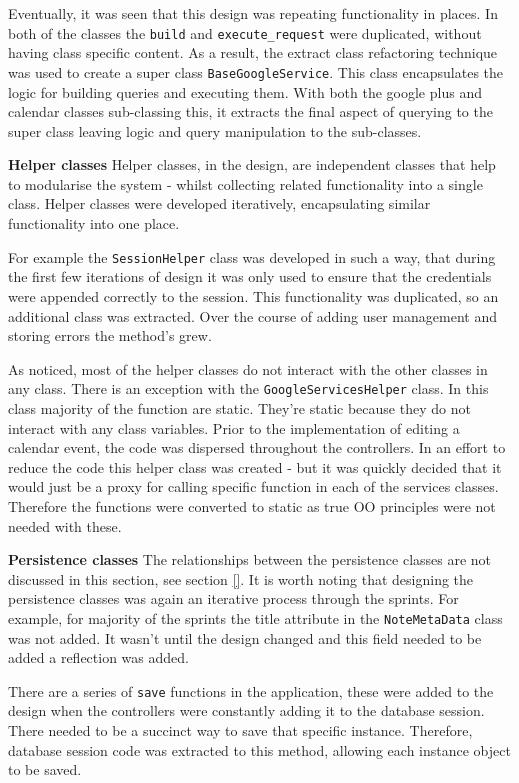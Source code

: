 Eventually, it was seen that this design was repeating functionality in places. In both of the classes the \texttt{build} and \texttt{execute\_request} were duplicated, without having class specific content. As a result, the extract class refactoring technique was used to create a super class \texttt{BaseGoogleService}. This class encapsulates the logic for building queries and executing them. With both the google plus and calendar classes sub-classing this, it extracts the final aspect of querying to the super class leaving logic and query manipulation to the sub-classes.

\textbf{Helper classes}
Helper classes, in the design, are independent classes that help to modularise the system - whilst collecting related functionality into a single class. Helper classes were developed iteratively, encapsulating similar functionality into one place.

For example the \texttt{SessionHelper} class was developed in such a way, that during the first few iterations of design it was only used to ensure that the credentials were appended correctly to the session. This functionality was duplicated, so an additional class was extracted. Over the course of adding user management and storing errors the method's grew.

As noticed, most of the helper classes do not interact with the other classes in any class. There is an exception with the \texttt{GoogleServicesHelper} class. In this class majority of the function are static.  They're static because they do not interact with any class variables. Prior to the implementation of editing a calendar event, the code was dispersed throughout the controllers. In an effort to reduce the code this helper class was created - but it was quickly decided that it would just be a proxy for calling specific function in each of the services classes. Therefore the functions were converted to static as true OO principles were not needed with these.

\textbf{Persistence classes}
The relationships between the persistence classes are not discussed in this section, see section \ref{}. It is worth noting that designing the persistence classes was again an iterative process through the sprints. For example, for majority of the sprints the title attribute in the \texttt{NoteMetaData} class was not added. It wasn't until the design changed and this field needed to be added a reflection was added.

There are a series of \texttt{save} functions in the application, these were added to the design when the controllers were constantly adding it to the database session. There needed to be a succinct way to save that specific instance. Therefore, database session code was extracted to this method, allowing each instance object to be saved.

